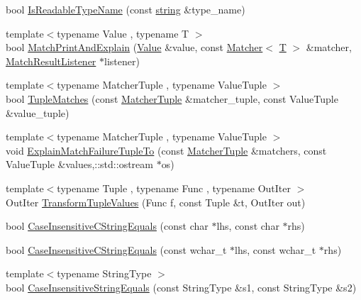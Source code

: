\begin{DoxyCompactItemize}
\item 
bool \hyperlink{namespacetesting_1_1internal_a19a5d50382569ce6ee94e2b68ddc6fc7}{Is\+Readable\+Type\+Name} (const \hyperlink{namespacetesting_1_1internal_a8e8ff5b11e64078831112677156cb111}{string} \&type\+\_\+name)
\item 
{\footnotesize template$<$typename Value , typename T $>$ }\\bool \hyperlink{namespacetesting_1_1internal_a0821df2611d54c79bac990719ad8a2dd}{Match\+Print\+And\+Explain} (\hyperlink{namespacetesting_ae44c50a3a7f0a46f05c8a0b0592b4a62}{Value} \&value, const \hyperlink{classtesting_1_1_matcher}{Matcher}$<$ \hyperlink{functions__7_8js_adf1f3edb9115acb0a1e04209b7a9937b}{T} $>$ \&matcher, \hyperlink{classtesting_1_1_match_result_listener}{Match\+Result\+Listener} $\ast$listener)
\item 
{\footnotesize template$<$typename Matcher\+Tuple , typename Value\+Tuple $>$ }\\bool \hyperlink{namespacetesting_1_1internal_a10095d1e1c99369200072b39d657ebc4}{Tuple\+Matches} (const \hyperlink{structtesting_1_1internal_1_1_matcher_tuple}{Matcher\+Tuple} \&matcher\+\_\+tuple, const Value\+Tuple \&value\+\_\+tuple)
\item 
{\footnotesize template$<$typename Matcher\+Tuple , typename Value\+Tuple $>$ }\\void \hyperlink{namespacetesting_1_1internal_afc791c20a43da984032e598698ac6ac4}{Explain\+Match\+Failure\+Tuple\+To} (const \hyperlink{structtesting_1_1internal_1_1_matcher_tuple}{Matcher\+Tuple} \&matchers, const Value\+Tuple \&values,\+::std\+::ostream $\ast$os)
\item 
{\footnotesize template$<$typename Tuple , typename Func , typename Out\+Iter $>$ }\\Out\+Iter \hyperlink{namespacetesting_1_1internal_a07ba091a64aa2ba95e41accc55dc8855}{Transform\+Tuple\+Values} (Func f, const Tuple \&t, Out\+Iter out)
\item 
bool \hyperlink{namespacetesting_1_1internal_aebfd0cd34de52d7973a5b2d03ba848cf}{Case\+Insensitive\+C\+String\+Equals} (const char $\ast$lhs, const char $\ast$rhs)
\item 
bool \hyperlink{namespacetesting_1_1internal_ad5b31f61a3cc5b4226d3560f5b48f4dd}{Case\+Insensitive\+C\+String\+Equals} (const wchar\+\_\+t $\ast$lhs, const wchar\+\_\+t $\ast$rhs)
\item 
{\footnotesize template$<$typename String\+Type $>$ }\\bool \hyperlink{namespacetesting_1_1internal_a383de24b1cca6648c14b03964c0ed843}{Case\+Insensitive\+String\+Equals} (const String\+Type \&s1, const String\+Type \&s2)

\end{DoxyCompactItemize}
